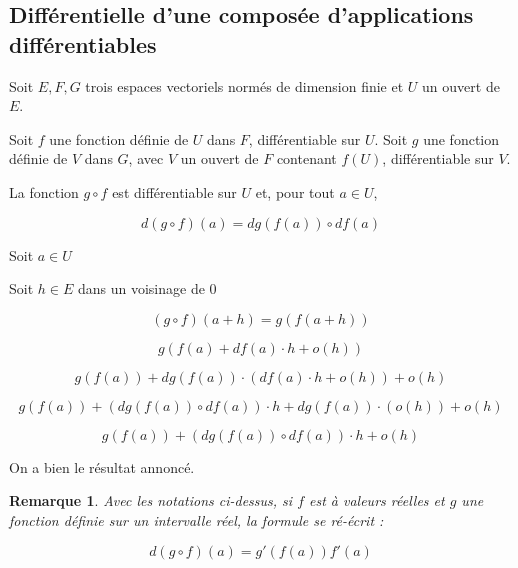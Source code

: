 \documentclass[a4paper,12pt]{book}
\newcommand{\Prop}[2]{\begin{tcolorbox}[sharp corners, colback=white,colframe=red!90!black!75, title=Proposition : #1]#2\end{tcolorbox}}
\newcommand{\Pre}[1]{\begin{tcolorbox}[sharp corners, colback=white,colframe=green!60!green!30!black!75, title=Preuve]#1\end{tcolorbox}}
\newtheorem{Rem}{Remarque}[section]
\begin{document}
\subsection{Différentielle d'une composée d'applications différentiables}
\Prop{}{Soit $E,F, G$ trois espaces vectoriels normés de dimension finie et $U$ un ouvert de $E$.
\par Soit $f$ une fonction définie de $U$ dans $F$, différentiable sur $U$. Soit $g$ une fonction définie de $V$ dans $G$, avec $V$ un ouvert de $F$ contenant $f(U)$, différentiable sur $V$.
\par La fonction $g\circ f$ est différentiable sur $U$ et, pour tout $a\in U$,
\par $$d(g\circ f)(a) = dg(f(a))\circ df(a)$$}
\Pre{Soit $a\in U$
\par Soit $h\in E$ dans un voisinage de $0$
\par $$(g\circ f)(a+h) = g(f(a+h))$$
\par $$g(f(a)+df(a)\cdot h+o(h))$$
\par $$g(f(a))+dg(f(a))\cdot (df(a)\cdot h+o(h))+o(h)$$
\par $$g(f(a))+(dg(f(a))\circ df(a))\cdot h+ dg(f(a))\cdot (o(h)) +o(h)$$
\par $$g(f(a))+(dg(f(a))\circ df(a))\cdot h+o(h)$$
\par On a bien le résultat annoncé.}
\begin{Rem}
Avec les notations ci-dessus, si $f$ est à valeurs réelles et $g$ une fonction définie sur un intervalle réel, la formule se ré-écrit :
\par $$d(g\circ f)(a) =g'(f(a))f'(a)$$
\end{Rem}
\end{document}
